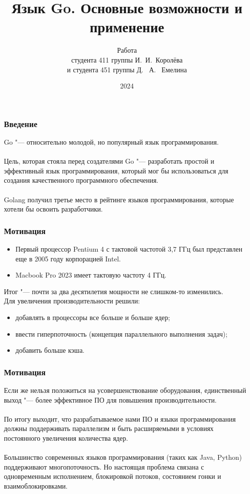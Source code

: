 \documentclass{beamer}
\title[Язык Go]{Язык Go. Основные возможности и применение}
\author{Работа \\ студента 411 группы И.~И.~Королёва \\ 
                  и студента 451 группы Д. ~А. ~Емелина}
\institute{{Саратовский государственный университет} \\ им.~Н.~Г.~Чернышевского
            \\[5pt]
            Кафедра математической кибернетики\\ и компьютерных наук\\[5pt]
            Научный руководитель: доцент Иванова ~А.~С. }
\date{2024}
\begin{document}
\begin{frame} 
  \titlepage 
\end{frame}
\begin{frame}[fragile] \frametitle{Введение}
  Go "--- относительно молодой, но популярный язык программирования.
  \\\\
  Цель, которая стояла перед создателями Go "--- разработать простой и
  эффективный язык программирования, который мог бы использоваться для
  создания качественного программного обеспечения.
  \\\\
  Golang получил третье место в рейтинге языков программирования,
  которые хотели бы освоить разработчики.
\end{frame}
\begin{frame}[fragile] \frametitle{Мотивация}
  \begin{itemize}
    \item Первый процессор Pentium 4 с тактовой частотой 3,7 ГГц был представлен
    еще в 2005 году корпорацией Intel. 
    \item Macbook Pro 2023 имеет тактовую частоту 4 ГГц. 
  \end{itemize}
  Итог "--- почти за два десятилетия мощности не слишком-то изменились.\\

  Для увеличения производительности решили:
  \begin{itemize}
    \item добавлять в процессоры все больше и больше ядер;
    \item ввести гиперпоточность (концепция параллельного выполнения задач);
    \item добавить больше кэша.
  \end{itemize}
\end{frame}
\begin{frame}[fragile] \frametitle{Мотивация}
  Если же нельзя положиться на усовершенствование оборудования, единственный
  выход "--- более эффективное ПО для повышения производительности. 
  \\\\
  По итогу выходит, что разрабатываемое нами ПО и языки программирования должны
  поддерживать параллелизм и быть расширяемыми в условиях постоянного увеличения
  количества ядер. 
  \\\\
  Большинство современных языков программирования (таких как Java, Python)
  поддерживают многопоточность. Но настоящая проблема связана с одновременным
  исполнением, блокировкой потоков, состоянием гонки и взаимоблокировками.
\end{frame}
\end{document}
